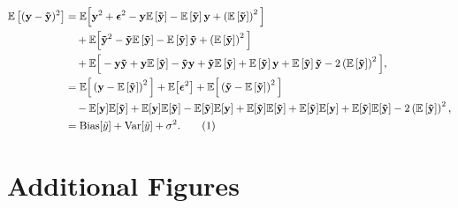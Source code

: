 \documentclass[aps,pra,english,notitlepage,reprint,nofootinbib]{revtex4-1}  %
\newcommand\numberthis{\addtocounter{equation}{1}\tag{\theequation}}
\begin{document}
\begin{align*}
\mathbb{E}\left[(\mathbf{y}-\mathbf{\tilde{y}})^2 \right] 
&= \mathbb{E}\Big[\mathbf{y}^2 + \boldsymbol{\epsilon}^2 - \mathbf{y}\mathbb{E}\left[\mathbf{\tilde{y}}\right] -\mathbb{E}\left[\mathbf{\tilde{y}}\right]\mathbf{y}  + \left(\mathbb{E}\left[\mathbf{\tilde{y}}\right]\right)^2\Big]
\\
&\hspace{10pt} + \mathbb{E}\Big[\mathbf{\tilde{y}}^2 - \mathbf{\tilde{y}}\mathbb{E}\left[\mathbf{\tilde{y}}\right] - \mathbb{E}\left[\mathbf{\tilde{y}}\right]\mathbf{\tilde{y}} + \left(\mathbb{E}\left[\mathbf{\tilde{y}}\right]\right)^2\Big]
\\
&\hspace{10pt} +\mathbb{E}\Big[-\mathbf{y}\mathbf{\tilde{y}} + \mathbf{y}\mathbb{E}\left[\mathbf{\tilde{y}} \right] - \mathbf{\tilde{y}}\mathbf{y} + \mathbf{\tilde{y}}\mathbb{E}\left[\mathbf{\tilde{y}}\right] +\mathbb{E}\left[\mathbf{\tilde{y}}\right]\mathbf{y} + \mathbb{E}\left[\mathbf{\tilde{y}}\right]\mathbf{\tilde{y}} - 2\left(\mathbb{E}\left[\mathbf{\tilde{y}}\right]\right)^2\Big],
\\
&= \mathbb{E}\Big[\left(\mathbf{y} - \mathbb{E}\left[\mathbf{\tilde{y}}\right]\right)^2\Big] + \mathbb{E}\big[\boldsymbol{\epsilon}^2\big] + \mathbb{E}\Big[\left(\mathbf{\tilde{y}} - \mathbb{E}\left[\mathbf{\tilde{y}}\right]\right)^2\Big]
\\
&\hspace{10pt} - \mathbb{E}[\mathbf{y}]\mathbb{E}[\mathbf{\tilde{y}}] + \mathbb{E}[\mathbf{y}]\mathbb{E}[\mathbf{\tilde{y}}] - \mathbb{E}[\mathbf{\tilde{y}}]\mathbb{E}[\mathbf{y}] + \mathbb{E}[\mathbf{\tilde{y}}]\mathbb{E}[\mathbf{\tilde{y}}] + \mathbb{E}[\mathbf{\tilde{y}}]\mathbb{E}[\mathbf{y}] + \mathbb{E}[\mathbf{\tilde{y}}]\mathbb{E}[\mathbf{\tilde{y}}] - 2\left(\mathbb{E}\left[\mathbf{\tilde{y}}\right]\right)^2,
\\
&= \text{Bias}[\tilde{y}] + \text{Var}[\tilde{y}] + \sigma^2. \numberthis \label{appeq:cost OLS}
\end{align*}


\section{Additional Figures}\label{appsec:figures}

\end{document}
